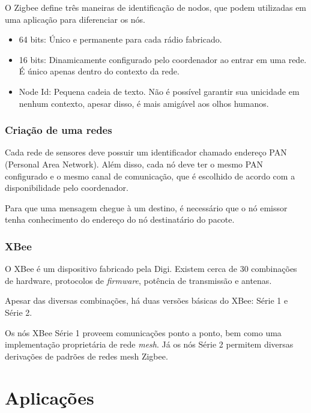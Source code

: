 \documentclass[
	article,			%
	11pt,				%
	oneside,			%
	a4paper,			%
	section=TITLE,		%
	subsection=TITLE,	%
	english,			%
	brazil,				%
	sumario=tradicional
	]{abntex2}
\begin{document}

O Zigbee define três maneiras de identificação de nodos, que podem utilizadas em uma aplicação para 
diferenciar os nós.

\begin{itemize} \parskip -4pt
	\item 64 bits: Único e permanente para cada rádio fabricado.
	\item 16 bits: Dinamicamente configurado pelo coordenador ao entrar em uma rede. É único apenas 
	dentro do contexto da rede.
	\item Node Id: Pequena cadeia de texto. Não é possível garantir sua unicidade em nenhum 
	contexto, apesar disso, é mais amigável aos olhos humanos.
\end{itemize}

\subsubsection{Criação de uma redes}

Cada rede de sensores deve possuir um identificador chamado endereço PAN (Personal Area Network). 
Além disso, cada nó deve ter o mesmo PAN configurado e o mesmo canal de comunicação, que é 
escolhido de acordo com a disponibilidade pelo coordenador. 

Para que uma mensagem chegue à um destino, é necessário que o nó emissor tenha conhecimento do 
endereço do nó destinatário do pacote.


\subsubsection{XBee}

O XBee é um dispositivo fabricado pela Digi. Existem cerca de 
30 combinações de hardware, protocolos de \textit{firmware}, potência de transmissão e antenas.

Apesar das diversas combinações, há duas versões básicas do XBee: Série 1 e Série 2.

Os nós XBee Série 1 proveem comunicações ponto a ponto, bem como uma implementação proprietária de 
rede \textit{mesh}. Já os nós Série 2 permitem diversas derivações de padrões de redes mesh Zigbee.

\section{Aplicações}
\end{document}

